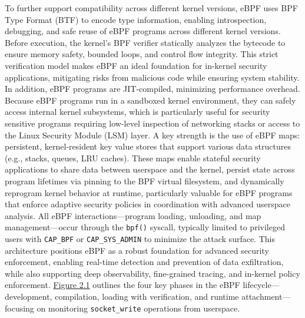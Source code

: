 \documentclass [11pt, proquest] {uwthesis}[2020/02/24]
\begin{document}
To further support compatibility across different kernel versions, eBPF uses BPF Type Format (BTF) to encode type information, enabling introspection, debugging, and safe reuse of eBPF programs across different kernel versions. Before execution, the kernel’s BPF verifier statically analyzes the bytecode to ensure memory safety, bounded loops, and control flow integrity. This strict verification model makes eBPF an ideal foundation for in-kernel security applications, mitigating risks from malicious code while ensuring system stability. In addition, eBPF programs are JIT-compiled, minimizing performance overhead. Because eBPF programs run in a sandboxed kernel environment, they can safely access internal kernel subsystems, which is particularly useful for security sensitive programs requiring low-level inspection of networking stacks or access to the Linux Security Module (LSM) layer. A key strength is the use of eBPF maps: persistent, kernel-resident key value stores that support various data structures (e.g., stacks, queues, LRU caches). These maps enable stateful security applications to share data between userspace and the kernel, persist state across program lifetimes via pinning to the BPF virtual filesystem, and dynamically reprogram kernel behavior at runtime, particularly valuable for eBPF programs that enforce adaptive security policies in coordination with advanced userspace analysis. All eBPF interactions—program loading, unloading, and map management—occur through the \texttt{bpf()} syscall, typically limited to privileged users with \texttt{CAP\_BPF} or \texttt{CAP\_SYS\_ADMIN} to minimize the attack surface. This architecture positions eBPF as a robust foundation for advanced security enforcement, enabling real-time detection and prevention of data exfiltration, while also supporting deep observability, fine-grained tracing, and in-kernel policy enforcement. \hyperref[fig:eBPF-injection]{Figure 2.1} outlines the four key phases in the eBPF lifecycle—development, compilation, loading with verification, and runtime attachment—focusing on monitoring \texttt{socket\_write} operations from userspace.
\end{document}
